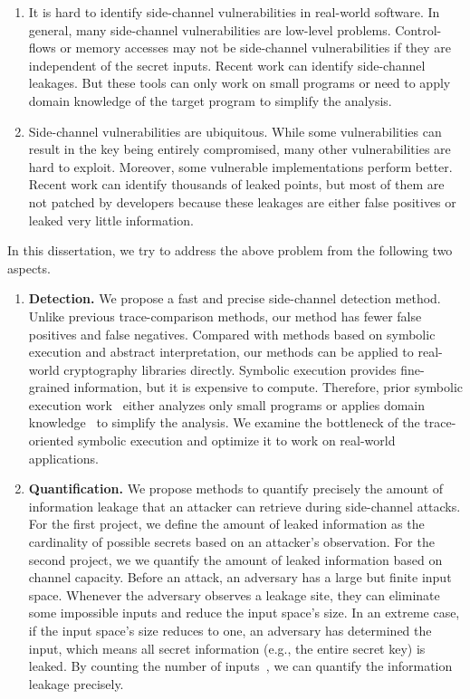 \begin{enumerate}
    \item It is hard to identify side-channel vulnerabilities in real-world software. In general, many side-channel vulnerabilities are low-level problems. Control-flows or memory accesses may not be side-channel vulnerabilities if they are independent of the secret inputs. Recent work can identify side-channel leakages. But these tools can only work on small programs or need to apply domain knowledge of the target program to simplify the analysis.
    \item Side-channel vulnerabilities are ubiquitous. While some vulnerabilities can result in the key being entirely compromised, many other vulnerabilities are hard to exploit. Moreover, some vulnerable implementations perform better. Recent work can identify thousands of leaked points, but most of them are not patched by developers because these leakages are either false positives or leaked very little information.
\end{enumerate}

In this dissertation, we try to address the above problem from the following two aspects.
\begin{enumerate}
    \item \textbf{Detection.} We propose a fast and precise side-channel detection method. Unlike previous trace-comparison methods, our method has fewer false positives and false negatives. Compared with methods based on symbolic execution and abstract interpretation, our methods can be applied to real-world cryptography libraries directly. Symbolic execution provides fine-grained information, but it is expensive to compute. Therefore, prior symbolic execution work~\cite{203878,236338,Brotzman19Casym} either analyzes only small programs or applies domain knowledge~\cite{203878} to simplify the analysis. We examine the bottleneck of the trace-oriented symbolic execution and optimize it to work on real-world applications.
    \item \textbf{Quantification.} We propose methods to quantify precisely the amount of information leakage that an attacker can retrieve during side-channel attacks. For the first project, we define the amount of leaked information as the cardinality of possible secrets based on an attacker's observation. For the second project, we we quantify the amount of leaked information based on channel capacity. Before an attack, an adversary has a large but finite input space. Whenever the adversary observes a leakage site, they can eliminate some impossible inputs and reduce the input space's size. In an extreme case, if the input space's size reduces to one, an adversary has determined the input, which means all secret information (e.g., the entire secret key) is leaked. By counting the number of inputs~\cite{10.1007/11499107_24}, we can quantify the information leakage precisely. 
\end{enumerate}


